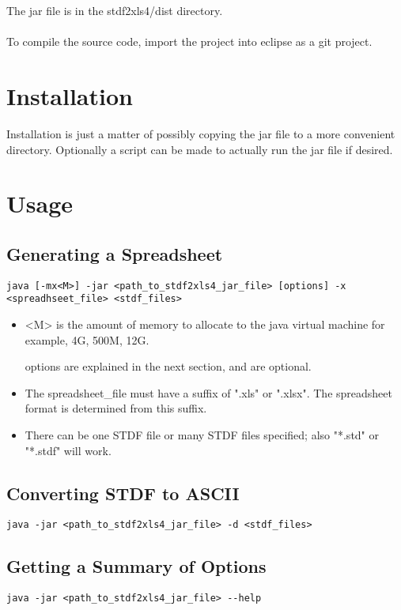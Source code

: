 \documentclass[letterpaper]{article}
\begin{document}
The jar file is in the stdf2xls4/dist directory.\\
\\
To compile the source code, import the project into eclipse as a git project.

\section{Installation}

Installation is just a matter of possibly copying the jar file to a more convenient
directory.  Optionally a script can be made to actually run the jar file if desired.

\section{Usage}

\subsection{Generating a Spreadsheet}
\begin{verbatim}
java [-mx<M>] -jar <path_to_stdf2xls4_jar_file> [options] -x <spreadhseet_file> <stdf_files>
\end{verbatim}
\begin{itemize}
\item <M> is the amount of memory to allocate to the java virtual machine for example, 4G, 500M, 12G.
\item [options] are explained in the next section, and are optional.
\item The spreadsheet\_file must have a suffix of ".xls" or ".xlsx".  The spreadsheet format is
determined from this suffix.
\item There can be one STDF file or many STDF files specified; also "*.std" or "*.stdf" will work.
\end{itemize}

\subsection{Converting STDF to ASCII}
\begin{verbatim}
java -jar <path_to_stdf2xls4_jar_file> -d <stdf_files>
\end{verbatim}

\subsection{Getting a Summary of Options}
\begin{verbatim}
java -jar <path_to_stdf2xls4_jar_file> --help
\end{verbatim}
\end{document}
